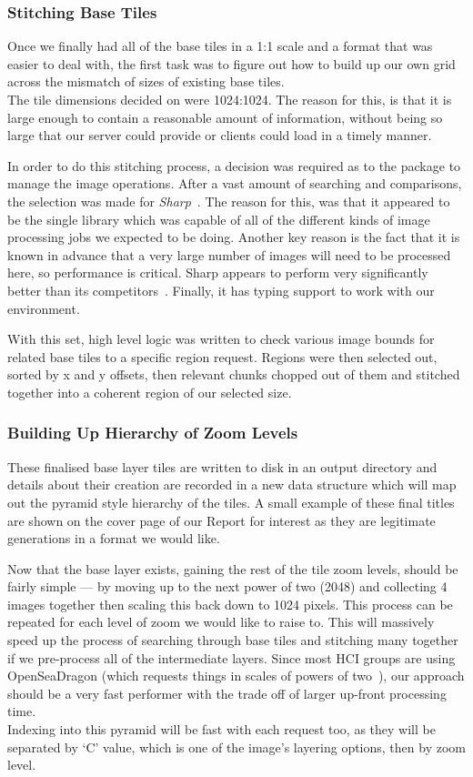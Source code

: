 \subsubsection{Stitching Base Tiles}
Once we finally had all of the base tiles in a 1:1 scale and a format that was easier to deal with, the first task
was to figure out how to build up our own grid across the mismatch of sizes of existing base tiles.\\
The tile dimensions decided on were 1024:1024. The reason for this, is that it is large enough to contain a
reasonable amount of information, without being so large that our server could provide or clients could load in
a timely manner.

In order to do this stitching process, a decision was required as to the package to manage the image operations.
After a vast amount of searching and comparisons, the selection was made for \emph{Sharp}~\cite{sharp}. The reason for
this, was that it appeared to be the single library which was capable of all of the different kinds of image
processing jobs we expected to be doing. Another key reason is the fact that it is known in advance that a very
large number of images will need to be processed here, so performance is critical. Sharp appears to perform
very significantly better than its competitors~\cite{sharpPerformance}. Finally, it has typing
support to work with our environment.

With this set, high level logic was written to check various image bounds for related base tiles to a specific
region request. Regions were then selected out, sorted by x and y offsets, then relevant chunks chopped out of
them and stitched together into a coherent region of our selected size.

\subsubsection{Building Up Hierarchy of Zoom Levels}
These finalised base layer tiles are written to disk in an output directory and details about their creation
are recorded in a new data structure which will map out the pyramid style hierarchy of the tiles.
A small example of these final titles are shown on the cover page of our Report for interest as they are
legitimate generations in a format we would like.

Now that the base layer exists, gaining the rest of the tile zoom levels, should be fairly simple --- by moving
up to the next power of two (2048) and collecting 4 images together then scaling this back down to 1024 pixels.
This process can be repeated for each level of zoom we would like to raise to. This will massively speed up
the process of searching through base tiles and stitching many together if we pre-process all of the intermediate
layers. Since most HCI groups are using OpenSeaDragon (which requests things in scales of powers
of two~\cite{openseadragon}), our approach should be a very fast performer with the trade off of larger up-front processing time.\\
Indexing into this pyramid will be fast with each request too, as they will be separated by `C' value, which is
one of the image's layering options, then by zoom level.

